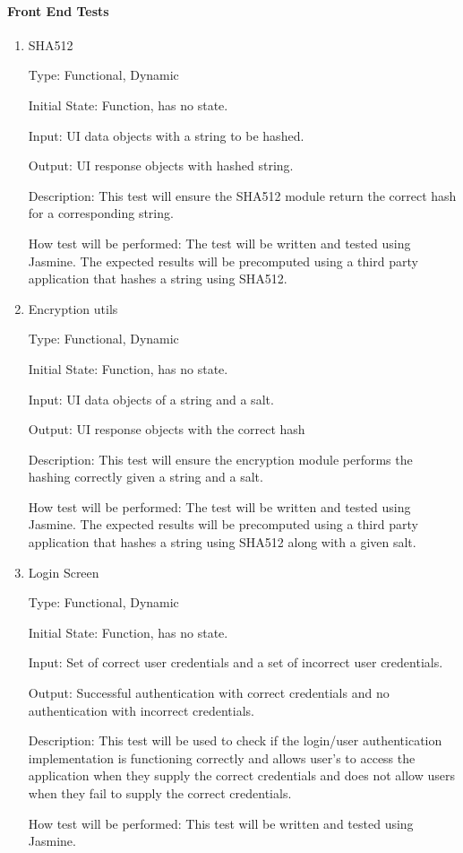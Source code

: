 \documentclass[12pt, titlepage]{article}
\begin{document}
  \paragraph{Front End Tests}
    \begin{enumerate}

      \item{SHA512\\}

      Type: Functional, Dynamic

      Initial State: Function, has no state.

      Input: UI data objects with a string to be hashed.

      Output: UI response objects with hashed string.

      Description: This test will ensure the SHA512 module return the correct
        hash for a corresponding string.

      How test will be performed: The test will be written and tested using
        Jasmine. The expected results will be precomputed using a third party
        application that hashes a string using SHA512.

      \item{Encryption utils\\}

      Type: Functional, Dynamic

      Initial State: Function, has no state.

      Input: UI data objects of a string and a salt.

      Output: UI response objects with the correct hash

      Description: This test will ensure the encryption module performs the
        hashing correctly given a string and a salt.

      How test will be performed: The test will be written and tested using
        Jasmine. The expected results will be precomputed using a third party
        application that hashes a string using SHA512 along with a given salt.

      \item{Login Screen\\}

      Type: Functional, Dynamic

      Initial State: Function, has no state.

      Input: Set of correct user credentials and a set of incorrect user credentials.

      Output: Successful authentication with correct credentials and no
          authentication with incorrect credentials.
                
      Description: This test will be used to check if the login/user authentication
          implementation is functioning correctly and allows user's to access the
          application when they supply the correct credentials and does not allow
          users when they fail to supply the correct credentials.
                

      How test will be performed: This test will be written and tested using Jasmine.

    \end{enumerate}
\end{document}
